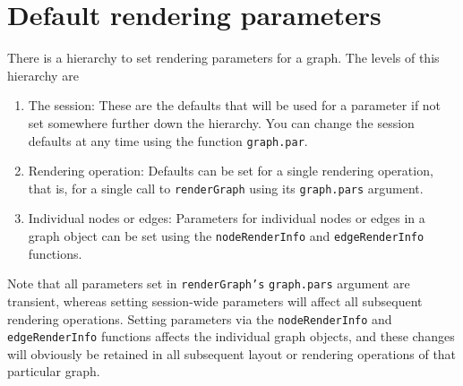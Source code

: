 \documentclass{article}
\newcommand{\Rfunction}[1]{{\texttt{#1}}}
\newcommand{\Robject}[1]{{\texttt{#1}}}
\begin{document}
\section{Default rendering parameters}
There is a hierarchy to set rendering parameters for a graph. The
levels of this hierarchy are
\begin{enumerate}
  
\item{The session:} These are the defaults that will be used for a
  parameter if not set somewhere further down the hierarchy. You can
  change the session defaults at any time using the function
  \Rfunction{graph.par}.
  
\item{Rendering operation:} Defaults can be set for a single rendering
  operation, that is, for a single call to \Rfunction{renderGraph}
  using its \Robject{graph.pars} argument.
  
\item{Individual nodes or edges:} Parameters for individual nodes or
  edges in a graph object can be set using the
  \Rfunction{nodeRenderInfo} and \Rfunction{edgeRenderInfo} functions.
  
\end{enumerate}

Note that all parameters set in \Rfunction{renderGraph's}
\Robject{graph.pars} argument are transient, whereas setting
session-wide parameters will affect all subsequent rendering
operations. Setting parameters via the \Rfunction{nodeRenderInfo} and
\Rfunction{edgeRenderInfo} functions affects the individual graph
objects, and these changes will obviously be retained in all
subsequent layout or rendering operations of that particular graph.


\end{document}
